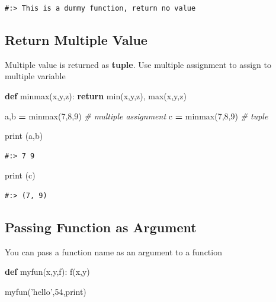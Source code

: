 \documentclass[
]{book}
\newenvironment{Shaded}{\begin{snugshade}}{\end{snugshade}}
\newcommand{\BuiltInTok}[1]{#1}
\newcommand{\CommentTok}[1]{\textcolor[rgb]{0.37,0.37,0.37}{\textit{#1}}}
\newcommand{\ControlFlowTok}[1]{\textcolor[rgb]{0.27,0.27,0.27}{\textbf{#1}}}
\newcommand{\DecValTok}[1]{\textcolor[rgb]{0.06,0.06,0.06}{#1}}
\newcommand{\KeywordTok}[1]{\textcolor[rgb]{0.27,0.27,0.27}{\textbf{#1}}}
\newcommand{\NormalTok}[1]{#1}
\newcommand{\OperatorTok}[1]{\textcolor[rgb]{0.43,0.43,0.43}{\textbf{#1}}}
\newcommand{\StringTok}[1]{\textcolor[rgb]{0.5,0.5,0.5}{#1}}
\begin{document}
\begin{verbatim}
#:> This is a dummy function, return no value
\end{verbatim}

\hypertarget{return-multiple-value}{%
\subsection{Return Multiple Value}\label{return-multiple-value}}

Multiple value is returned as \textbf{tuple}. Use multiple assignment to assign to multiple variable

\begin{Shaded}
\begin{Highlighting}[]
\KeywordTok{def}\NormalTok{ minmax(x,y,z):}
    \ControlFlowTok{return} \BuiltInTok{min}\NormalTok{(x,y,z), }\BuiltInTok{max}\NormalTok{(x,y,z)}

\NormalTok{a,b }\OperatorTok{=}\NormalTok{ minmax(}\DecValTok{7}\NormalTok{,}\DecValTok{8}\NormalTok{,}\DecValTok{9}\NormalTok{)     }\CommentTok{# multiple assignment}
\NormalTok{c   }\OperatorTok{=}\NormalTok{ minmax(}\DecValTok{7}\NormalTok{,}\DecValTok{8}\NormalTok{,}\DecValTok{9}\NormalTok{)     }\CommentTok{# tuple}

\BuiltInTok{print}\NormalTok{ (a,b)}
\end{Highlighting}
\end{Shaded}

\begin{verbatim}
#:> 7 9
\end{verbatim}

\begin{Shaded}
\begin{Highlighting}[]
\BuiltInTok{print}\NormalTok{ (c)    }
\end{Highlighting}
\end{Shaded}

\begin{verbatim}
#:> (7, 9)
\end{verbatim}

\hypertarget{passing-function-as-argument}{%
\subsection{Passing Function as Argument}\label{passing-function-as-argument}}

You can pass a function name as an argument to a function

\begin{Shaded}
\begin{Highlighting}[]
\KeywordTok{def}\NormalTok{ myfun(x,y,f):}
\NormalTok{    f(x,y)}

\NormalTok{myfun(}\StringTok{'hello'}\NormalTok{,}\DecValTok{54}\NormalTok{,}\BuiltInTok{print}\NormalTok{)}
\end{Highlighting}
\end{Shaded}
\end{document}
